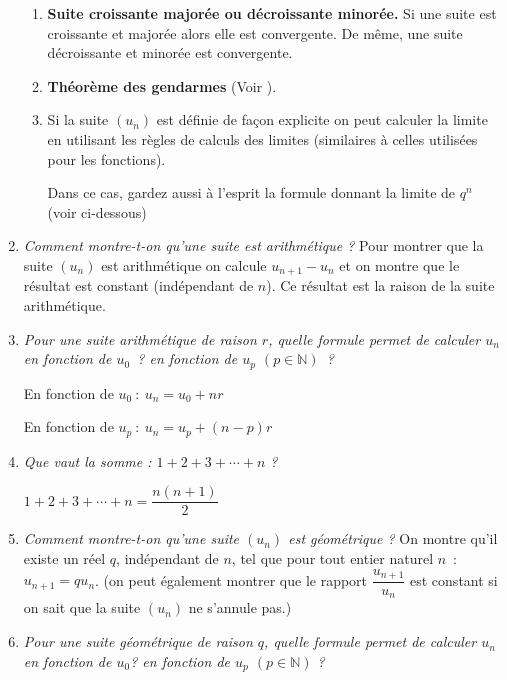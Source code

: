 \begin{reponses}
\begin{enumerate}
          \begin{enumerate}[label=\alph*.]
               \item %
               \textbf{Suite croissante majorée ou décroissante minorée.}
               Si une suite est croissante et majorée alors elle est convergente. De même, une suite décroissante et minorée est convergente.
               \item %
               \textbf{Théorème des gendarmes} (Voir ).
               \item %
               Si la suite $(u_n)$ est définie de façon explicite on peut calculer la limite en utilisant les règles de calculs des limites (similaires à celles utilisées pour les fonctions).
               \par
               Dans ce cas, gardez aussi à l'esprit la formule donnant la limite de $q^n$ (voir ci-dessous)
          \end{enumerate}
          \item %
          \textit{Comment montre-t-on qu'une suite est arithmétique ?}
          Pour montrer que la suite $(u_n)$ est arithmétique on calcule $u_{n+1}-u_n$ et on montre que le résultat est constant (indépendant de $n$). Ce résultat est la raison de la suite arithmétique.
          \item %
          \textit{Pour une suite arithmétique de raison $r$, quelle formule permet de calculer $u_n$ en fonction de $u_0 $~? en fonction de $u_p$  $(p \in \mathbb{N})$~?}
          \par
          En fonction de $u_0~:~u_n=u_0+nr$
          \par
          En fonction de $u_p~:~u_n=u_p+(n-p)r$
          \item %
          \textit{Que vaut la somme : $1+2+3+\cdots+n$ ?}
          \par
          $1+2+3+\cdots+n=\dfrac{n(n+1)}{2}$
          \item %
          \textit{Comment montre-t-on qu'une suite $(u_n)$ est géométrique ?}
          On montre qu'il existe un réel $q$, indépendant de $n$, tel que pour tout entier naturel $n$~: $u_{n+1}=qu_n$.
          (on peut également montrer que le rapport $\dfrac{u_{n+1}}{u_n}$ est constant si on sait que la suite $(u_n)$ ne s'annule pas.)
          \item %
          \textit{Pour une suite géométrique de raison $q$, quelle formule permet de calculer $u_n$ en fonction de $u_0 $? en fonction de $u_p$  $(p \in \mathbb{N})$ ?}

\end{enumerate}
\end{reponses}
